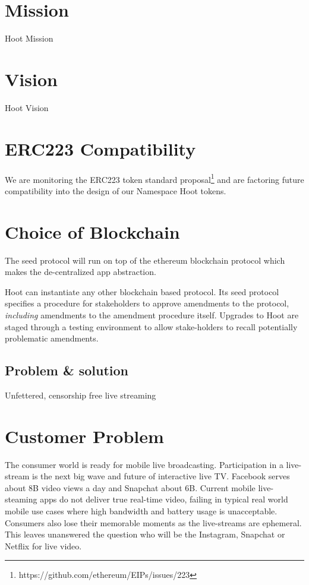 \documentclass{article}
\begin{document}
\section{Mission}
Hoot Mission

\section{Vision}
Hoot Vision

\section{ERC223 Compatibility}
We are monitoring the ERC223 token standard proposal\footnote{https://github.com/ethereum/EIPs/issues/223} and are factoring future compatibility into the design of our Namespace Hoot tokens.

\section{Choice of Blockchain}
The seed protocol will run on top of the ethereum blockchain protocol which makes the de-centralized app abstraction. 


Hoot can instantiate any other blockchain based protocol. Its seed protocol specifies a procedure for stakeholders to approve amendments to the protocol,
\emph{including} amendments to the amendment procedure itself.
Upgrades to Hoot are staged through a testing environment to allow stake-holders to recall potentially problematic amendments.


\subsection{Problem \& solution}
Unfettered, censorship free live streaming


\section{Customer Problem}
The consumer world is ready for mobile live broadcasting. Participation in a live-stream is the next big wave and future of interactive live TV. Facebook serves about 8B video views a day and Snapchat about 6B. Current mobile live-steaming apps do not deliver true real-time video, failing in typical real world mobile use cases where high bandwidth and battery usage is unacceptable. Consumers also lose their memorable moments as the live-streams are ephemeral. This leaves unanswered the question who will be the Instagram, Snapchat or Netflix for live video.
\end{document}
